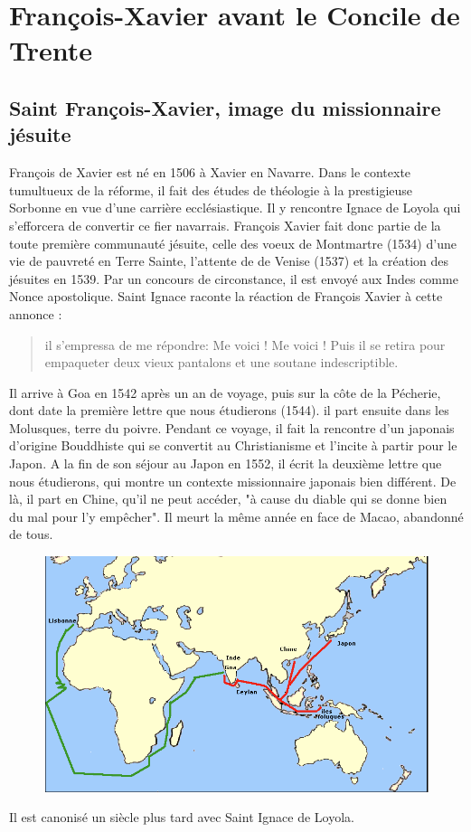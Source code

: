 \chapter{François-Xavier avant le Concile de Trente}



\section{Saint François-Xavier, image du missionnaire jésuite}
François de Xavier est né en 1506 à Xavier en Navarre. Dans le contexte tumultueux de la réforme, il fait des études de théologie à la prestigieuse Sorbonne en vue d'une carrière ecclésiastique. Il y rencontre Ignace de Loyola qui s'efforcera de convertir ce fier navarrais. François Xavier fait donc partie de la toute première communauté jésuite, celle des voeux de Montmartre (1534) d'une vie de pauvreté en Terre Sainte, l'attente de de Venise (1537) et la création des jésuites en 1539. Par un concours de circonstance, il est envoyé aux Indes comme Nonce apostolique. Saint Ignace raconte la réaction de François Xavier à cette annonce : 
\begin{quote}
    il s’empressa de me répondre:
Me voici ! Me voici !
Puis il se retira pour empaqueter deux vieux pantalons
et une soutane indescriptible.
\end{quote}

Il arrive à Goa en 1542 après un an de voyage, puis sur la côte de la Pécherie, dont date la première lettre que nous étudierons (1544). il part ensuite dans les Molusques, terre du poivre. Pendant ce voyage, il fait la rencontre d'un japonais d'origine Bouddhiste qui se convertit au Christianisme et l'incite à partir pour le Japon. A la fin de son séjour au Japon en 1552, il écrit la deuxième lettre que nous étudierons,  qui montre un contexte missionnaire japonais bien différent. De là, il part en Chine, qu'il ne peut accéder, "à cause du diable qui se donne bien du mal pour l'y empêcher". Il meurt la même année en face de Macao, abandonné de tous.
\begin{figure}[h!]
    \centering
    \includegraphics[width=.8\textwidth]{SeminaireMission/images/voyagesFrancoisXavier.png}
    

    \label{fig:my_label}
\end{figure}
Il est canonisé un siècle plus tard avec Saint Ignace de Loyola.

